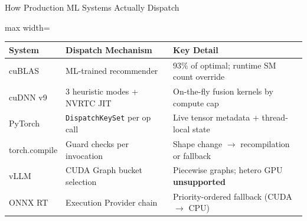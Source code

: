 \documentclass[aspectratio=169,10pt]{beamer}
\begin{document}
\begin{frame}{How Production ML Systems Actually Dispatch}
  \begin{center}
  \begin{adjustbox}{max width=\textwidth}
  \begin{tabular}{@{}l l l@{}}
    \toprule
    \textbf{System} & \textbf{Dispatch Mechanism} & \textbf{Key Detail} \\
    \midrule
    cuBLAS & ML-trained recommender & 93\% of optimal; runtime SM count override \\
    cuDNN v9 & 3 heuristic modes + NVRTC JIT & On-the-fly fusion kernels by compute cap \\
    PyTorch & \texttt{DispatchKeySet} per op call & Live tensor metadata + thread-local state \\
    torch.compile & Guard checks per invocation & Shape change $\to$ recompilation or fallback \\
    vLLM & CUDA Graph bucket selection & Piecewise graphs; hetero GPU \textbf{unsupported} \\
    ONNX RT & Execution Provider chain & Priority-ordered fallback (CUDA $\to$ CPU) \\
    \bottomrule
  \end{tabular}
  \end{adjustbox}
  \end{center}
  \vspace{0.5em}
  \begin{center}
  \end{center}
\end{frame}
\end{document}
